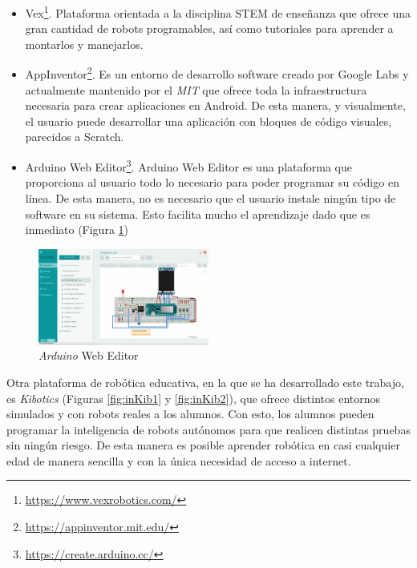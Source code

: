 \begin{itemize}
  \item Vex\footnote{\url{https://www.vexrobotics.com/}}. Plataforma orientada a la disciplina STEM de enseñanza que ofrece una gran cantidad de robots programables, así como tutoriales para aprender a montarlos y manejarlos. 
  \item AppInventor\footnote{\url{https://appinventor.mit.edu/}}. Es un entorno de desarrollo software creado por Google Labs y actualmente mantenido por el \textit{MIT} que ofrece toda la infraestructura necesaria para crear aplicaciones en Android. De esta manera, y visualmente, el usuario puede desarrollar una aplicación con bloques de código visuales, parecidos a Scratch.
  \item Arduino Web Editor\footnote{\url{https://create.arduino.cc/}}. Arduino Web Editor es una plataforma que proporciona al usuario todo lo necesario para poder programar su código en línea. De esta manera, no es necesario que el usuario instale ningún tipo de software en su sistema. Esto facilita mucho el aprendizaje dado que es inmediato (Figura \ref{fig.arduino})
  
\end{itemize}
 \begin{figure}[H]
  \begin{center}
    \includegraphics[width=0.5\textwidth]{figures/introduccion/arduino.png}
		\caption{\textit{Arduino} Web Editor}
		\label{fig.arduino}
		\end{center}
\end{figure}
Otra plataforma de robótica educativa, en la que se ha desarrollado este trabajo, es \textit{Kibotics} (Figuras \ref{fig:inKib1} y \ref{fig:inKib2}), que ofrece distintos entornos simulados y con robots reales a los alumnos. Con esto, los alumnos pueden programar la inteligencia de robots autónomos para que realicen distintas pruebas sin ningún riesgo. De esta manera es posible aprender robótica en casi cualquier edad de manera sencilla y con la única necesidad de acceso a internet.
